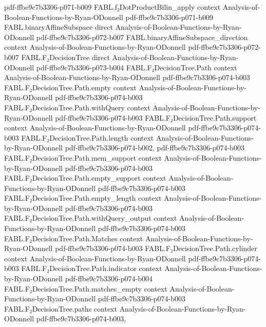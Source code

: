 \begin{theorem}
  {pdf-ffbe9c7b3306-p071-b009}
\proofstep
  {FABL.f₂DotProductBilin_apply}
  {context}
  {Analysis-of-Boolean-Functions-by-Ryan-ODonnell}
  {pdf-ffbe9c7b3306-p071-b009}
\proofstep
  {FABL.binaryAffineSubspace}
  {direct}
  {Analysis-of-Boolean-Functions-by-Ryan-ODonnell}
  {pdf-ffbe9c7b3306-p072-b007}
\proofstep
  {FABL.binaryAffineSubspace_direction}
  {context}
  {Analysis-of-Boolean-Functions-by-Ryan-ODonnell}
  {pdf-ffbe9c7b3306-p072-b007}
\proofstep
  {FABL.F₂DecisionTree}
  {direct}
  {Analysis-of-Boolean-Functions-by-Ryan-ODonnell}
  {pdf-ffbe9c7b3306-p073-b004}
\proofstep
  {FABL.F₂DecisionTree.Path}
  {context}
  {Analysis-of-Boolean-Functions-by-Ryan-ODonnell}
  {pdf-ffbe9c7b3306-p074-b003}
\proofstep
  {FABL.F₂DecisionTree.Path.empty}
  {context}
  {Analysis-of-Boolean-Functions-by-Ryan-ODonnell}
  {pdf-ffbe9c7b3306-p074-b003}
\proofstep
  {FABL.F₂DecisionTree.Path.withQuery}
  {context}
  {Analysis-of-Boolean-Functions-by-Ryan-ODonnell}
  {pdf-ffbe9c7b3306-p074-b003}
\proofstep
  {FABL.F₂DecisionTree.Path.support}
  {context}
  {Analysis-of-Boolean-Functions-by-Ryan-ODonnell}
  {pdf-ffbe9c7b3306-p074-b003}
\proofstep
  {FABL.F₂DecisionTree.Path.length}
  {context}
  {Analysis-of-Boolean-Functions-by-Ryan-ODonnell}
  {pdf-ffbe9c7b3306-p074-b002,
    pdf-ffbe9c7b3306-p074-b003}
\proofstep
  {FABL.F₂DecisionTree.Path.mem_support}
  {context}
  {Analysis-of-Boolean-Functions-by-Ryan-ODonnell}
  {pdf-ffbe9c7b3306-p074-b003}
\proofstep
  {FABL.F₂DecisionTree.Path.empty_support}
  {context}
  {Analysis-of-Boolean-Functions-by-Ryan-ODonnell}
  {pdf-ffbe9c7b3306-p074-b003}
\proofstep
  {FABL.F₂DecisionTree.Path.empty_length}
  {context}
  {Analysis-of-Boolean-Functions-by-Ryan-ODonnell}
  {pdf-ffbe9c7b3306-p074-b003}
\proofstep
  {FABL.F₂DecisionTree.Path.withQuery_output}
  {context}
  {Analysis-of-Boolean-Functions-by-Ryan-ODonnell}
  {pdf-ffbe9c7b3306-p074-b003}
\proofstep
  {FABL.F₂DecisionTree.Path.Matches}
  {context}
  {Analysis-of-Boolean-Functions-by-Ryan-ODonnell}
  {pdf-ffbe9c7b3306-p074-b003}
\proofstep
  {FABL.F₂DecisionTree.Path.cylinder}
  {context}
  {Analysis-of-Boolean-Functions-by-Ryan-ODonnell}
  {pdf-ffbe9c7b3306-p074-b003}
\proofstep
  {FABL.F₂DecisionTree.Path.indicator}
  {context}
  {Analysis-of-Boolean-Functions-by-Ryan-ODonnell}
  {pdf-ffbe9c7b3306-p074-b004}
\proofstep
  {FABL.F₂DecisionTree.Path.matches_empty}
  {context}
  {Analysis-of-Boolean-Functions-by-Ryan-ODonnell}
  {pdf-ffbe9c7b3306-p074-b003}
\proofstep
  {FABL.F₂DecisionTree.paths}
  {context}
  {Analysis-of-Boolean-Functions-by-Ryan-ODonnell}
  {pdf-ffbe9c7b3306-p074-b003,
}
\end{theorem}
